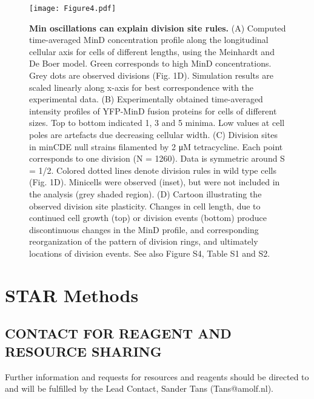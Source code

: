 \begin{figure}
    \centering
    \texttt{[image: Figure4.pdf]}
    \caption{ 
        \textbf{Min oscillations can explain division site rules.}           
         (A) Computed time-averaged MinD concentration profile along the longitudinal cellular axis for cells of different lengths, using the Meinhardt and De Boer \cite{Meinhardt2001} model. Green corresponds to high MinD concentrations. Grey dots are observed divisions (Fig. 1D). Simulation results are scaled linearly along x-axis for best correspondence with the experimental data. (B) Experimentally obtained time-averaged intensity profiles of YFP-MinD fusion proteins for cells of different sizes. Top to bottom indicated 1, 3 and 5 minima. Low values at cell poles are artefacts due decreasing cellular width. (C) Division sites in minCDE null strains filamented by 2 μM tetracycline. Each point corresponds to one division (N = 1260). Data is symmetric around S = 1/2. Colored dotted lines denote division rules in wild type cells (Fig. 1D). Minicells were observed (inset), but were not included in the analysis (grey shaded region).  (D) Cartoon illustrating the observed division site plasticity. Changes in cell length, due to continued cell growth (top) or division events (bottom) produce discontinuous changes in the MinD profile, and corresponding reorganization of the pattern of division rings, and ultimately locations of division events. See also Figure S4, Table S1 and S2.        
    }
    \label{fig:filarecovery:fig4}
\end{figure}




\section{STAR Methods}

\subsection{CONTACT FOR REAGENT AND RESOURCE SHARING}
Further information and requests for resources and reagents should be directed to and will be fulfilled by the Lead Contact, Sander Tans (Tans@amolf.nl).

